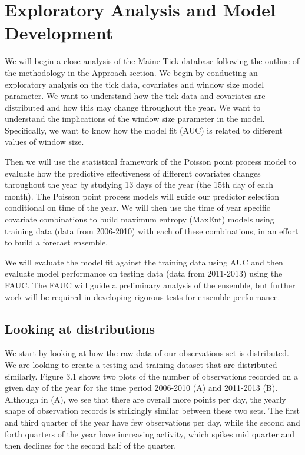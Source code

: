 
\chapter{Exploratory Analysis and Model Development} %

\label{Chapter2} %


We will begin a close analysis of the Maine Tick database following the outline of the methodology in the Approach section. We begin by conducting an exploratory analysis on the tick data, covariates and window size model parameter. We want to understand how the tick data and covariates are distributed and how this may change throughout the year. We want to understand the implications of the window size parameter in the model. Specifically, we want to know how the model fit (AUC) is related to different values of window size. \newline

\noindent Then we will use the statistical framework of the Poisson point process model to evaluate how the predictive effectiveness of different covariates changes throughout the year by studying 13 days of the year (the 15th day of each month). The Poisson point process models will guide our predictor selection conditional on time of the year. We will then use the time of year specific covariate combinations to build maximum entropy (MaxEnt) models using training data (data from 2006-2010) with each of these combinations, in an effort to build a forecast ensemble. \newline

\noindent We will evaluate the model fit against the training data using AUC and then evaluate model performance on testing data (data from 2011-2013) using the FAUC. The FAUC will guide a preliminary analysis of the ensemble, but further work will be required in developing rigorous tests for ensemble performance. 

\section{Looking at distributions }

We start by looking at how the raw data of our observations set is distributed. We are looking to create a testing and training dataset that are distributed similarly. Figure 3.1 shows two plots of the number of observations recorded on a given day of the year for the time period 2006-2010 (A) and 2011-2013 (B). Although in (A), we see that there are overall more points per day, the yearly shape of observation records is strikingly similar between these two sets. The first and third quarter of the year have few observations per day, while the second and forth quarters of the year have increasing activity, which spikes mid quarter and then declines for the second half of the quarter. \newline

